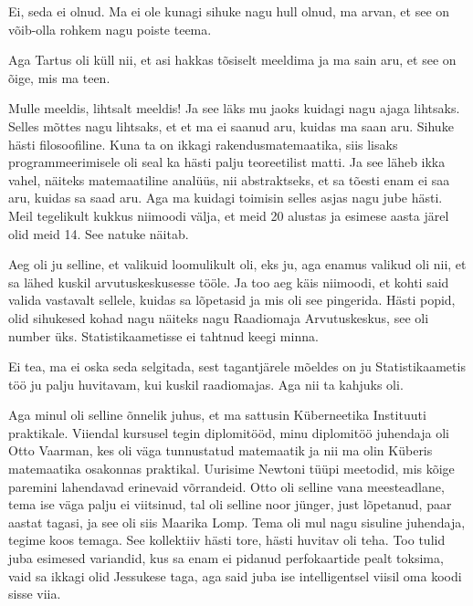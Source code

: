 
Ei, seda ei olnud. Ma ei ole kunagi sihuke nagu hull olnud, ma arvan, et see on võib-olla rohkem nagu poiste teema. 


Aga Tartus oli küll nii, et asi hakkas tõsiselt meeldima ja ma sain aru, et see on õige, mis ma teen. 


Mulle meeldis, lihtsalt meeldis! Ja see läks mu jaoks kuidagi nagu ajaga lihtsaks. Selles mõttes nagu lihtsaks, et et ma ei saanud aru, kuidas ma saan aru. Sihuke hästi filosoofiline. Kuna ta on ikkagi rakendusmatemaatika, siis lisaks  programmeerimisele oli seal ka hästi palju teoreetilist matti. Ja see läheb ikka vahel, näiteks matemaatiline analüüs, nii  abstraktseks, et sa tõesti enam ei saa aru, kuidas sa saad aru. Aga ma kuidagi toimisin selles asjas nagu jube hästi. Meil tegelikult kukkus niimoodi välja, et  meid  20 alustas ja esimese aasta järel olid meid 14. See natuke näitab. 


Aeg oli ju selline, et valikuid loomulikult oli, eks ju, aga enamus valikud oli nii, et sa lähed kuskil arvutuskeskusesse tööle. Ja too aeg käis  niimoodi, et kohti said valida vastavalt sellele, kuidas sa lõpetasid ja mis oli see pingerida. Hästi popid, olid sihukesed kohad nagu näiteks nagu Raadiomaja Arvutuskeskus, see oli number üks. Statistikaametisse ei tahtnud keegi minna.


Ei tea, ma ei oska seda selgitada, sest tagantjärele mõeldes on ju Statistikaametis töö ju palju huvitavam, kui kuskil raadiomajas. Aga nii ta kahjuks oli.

Aga minul oli selline õnnelik juhus, et ma sattusin Küberneetika Instituuti  praktikale. Viiendal kursusel tegin diplomitööd, minu diplomitöö juhendaja oli Otto Vaarman, kes oli väga tunnustatud matemaatik ja nii ma olin Küberis matemaatika osakonnas praktikal. Uurisime  Newtoni tüüpi meetodid, mis kõige paremini lahendavad erinevaid võrrandeid. Otto oli selline vana meesteadlane, tema ise väga palju ei viitsinud, tal oli selline noor jünger, just lõpetanud, paar aastat tagasi, ja see oli siis Maarika Lomp. Tema oli mul nagu sisuline juhendaja, tegime koos temaga. See kollektiiv hästi tore, hästi huvitav oli teha. Too tulid juba esimesed variandid, kus sa enam ei pidanud perfokaartide pealt toksima, vaid sa ikkagi olid Jessukese taga, aga said juba ise intelligentsel viisil oma koodi  sisse viia. 

